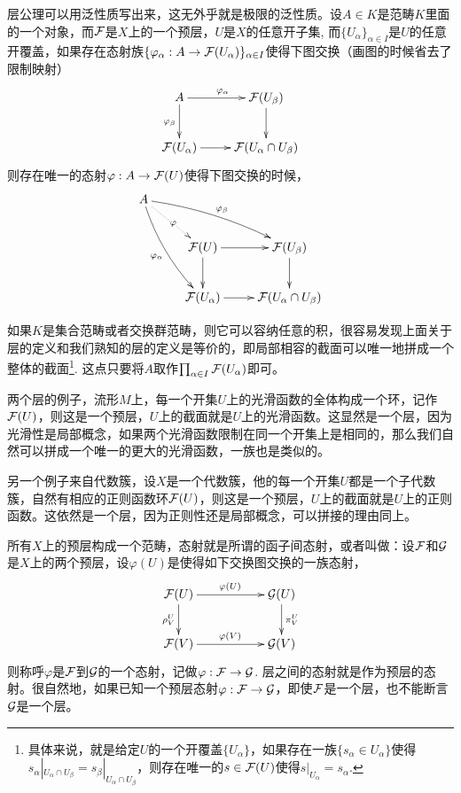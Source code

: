 层公理可以用泛性质写出来，这无外乎就是极限的泛性质。设$A\in K$是范畴$K$里面的一个对象，而$\mathcal{F}$是$X$上的一个预层，$U$是$X$的任意开子集, 而$\{U_\alpha\}_{\alpha\in I}$是$U$的任意开覆盖，如果存在态射族$\{\varphi_\alpha:A\to \mathcal{F}(U_\alpha)\}_{\alpha\in I}$使得下图交换（画图的时候省去了限制映射）
\[
	\xymatrix{
		A\ar[r]^{\varphi_{\alpha}}\ar[d]_{\varphi_{\beta}}&\calf(U_\beta)\ar[d]\\
		\calf(U_\alpha)\ar[r]&\calf(U_{\alpha}\cap U_{\beta})
	}
\]
则存在唯一的态射$\varphi:A\to \mathcal{F}(U)$使得下图交换的时候，
\[
	\xymatrix{
		A\ar@/_/[ddr]_{\varphi_{\alpha}}\ar@/^/[drr]^{\varphi_{\beta}}\ar@{.>}[dr]|{\varphi}&& \\
		&\calf(U)\ar[r]\ar[d]&\calf(U_\beta)\ar[d]\\
		&\calf(U_\alpha)\ar[r]&\calf(U_{\alpha}\cap U_{\beta})
	}
\]

如果$K$是集合范畴或者交换群范畴，则它可以容纳任意的积，很容易发现上面关于层的定义和我们熟知的层的定义是等价的，即局部相容的截面可以唯一地拼成一个整体的截面\footnote{具体来说，就是给定$U$的一个开覆盖$\{U_\alpha\}$，如果存在一族$\{s_\alpha\in U_\alpha\}$使得$s_\alpha|_{U_\alpha\cap U_\beta}=s_\beta|_{U_\alpha\cap U_\beta}$，则存在唯一的$s\in \mathcal{F}(U)$使得$s|_{U_\alpha}=s_\alpha$.}. 这点只要将$A$取作$\prod_{\alpha\in I}\mathcal{F}(U_\alpha)$即可。

\begin{para}
两个层的例子，流形$M$上，每一个开集$U$上的光滑函数的全体构成一个环，记作$\mathcal{F}(U)$，则这是一个预层，$U$上的截面就是$U$上的光滑函数。这显然是一个层，因为光滑性是局部概念，如果两个光滑函数限制在同一个开集上是相同的，那么我们自然可以拼成一个唯一的更大的光滑函数，一族也是类似的。

另一个例子来自代数簇，设$X$是一个代数簇，他的每一个开集$U$都是一个子代数簇，自然有相应的正则函数环$\mathcal{F}(U)$，则这是一个预层，$U$上的截面就是$U$上的正则函数。这依然是一个层，因为正则性还是局部概念，可以拼接的理由同上。
\end{para}

\begin{para}
所有$X$上的预层构成一个范畴，态射就是所谓的函子间态射，或者叫做：设$\mathcal{F}$和$\mathcal{G}$是$X$上的两个预层，设$\varphi(U)$是使得如下交换图交换的一族态射，
\[
	\xymatrix{
		\calf(U)\ar[rr]^{\varphi(U)} \ar[d]_{\rho^U_V}&&\calg(U) \ar[d]^{\pi^U_V}\\
		\calf(V)\ar[rr]^{\varphi(V)}&&\calg(V)
	}
\]
则称呼$\varphi$是$\mathcal{F}$到$\mathcal{G}$的一个态射，记做$\varphi:\mathcal{F}\to\mathcal{G}$. 层之间的态射就是作为预层的态射。很自然地，如果已知一个预层态射$\varphi:\mathcal{F}\to\mathcal{G}$，即使$\mathcal{F}$是一个层，也不能断言$\mathcal{G}$是一个层。
\end{para}

